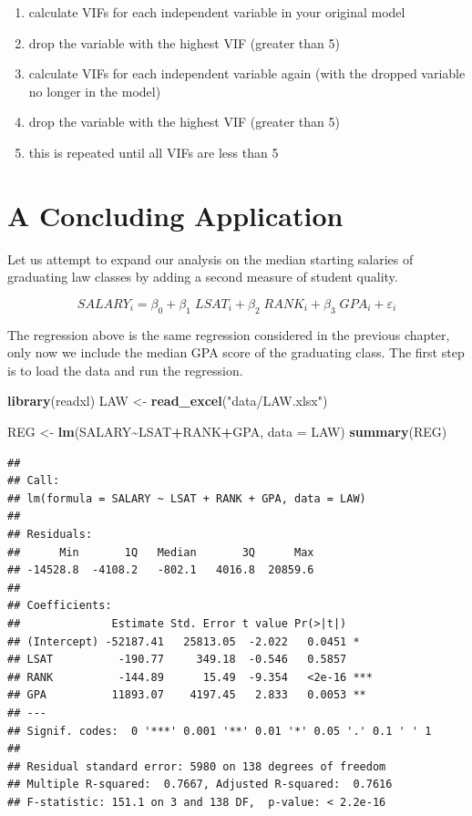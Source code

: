\documentclass[
]{book}
\newenvironment{Shaded}{\begin{snugshade}}{\end{snugshade}}
\newcommand{\AttributeTok}[1]{\textcolor[rgb]{0.13,0.29,0.53}{#1}}
\newcommand{\FunctionTok}[1]{\textcolor[rgb]{0.13,0.29,0.53}{\textbf{#1}}}
\newcommand{\NormalTok}[1]{#1}
\newcommand{\OtherTok}[1]{\textcolor[rgb]{0.56,0.35,0.01}{#1}}
\newcommand{\SpecialCharTok}[1]{\textcolor[rgb]{0.81,0.36,0.00}{\textbf{#1}}}
\newcommand{\StringTok}[1]{\textcolor[rgb]{0.31,0.60,0.02}{#1}}
\begin{document}
\begin{enumerate}
\def\labelenumi{\arabic{enumi}.}
\item
  calculate VIFs for each independent variable in your original model
\item
  drop the variable with the highest VIF (greater than 5)
\item
  calculate VIFs for each independent variable again (with the dropped variable no longer in the model)
\item
  drop the variable with the highest VIF (greater than 5)
\item
  this is repeated until all VIFs are less than 5
\end{enumerate}

\section{A Concluding Application}\label{a-concluding-application-2}

Let us attempt to expand our analysis on the median starting salaries of graduating law classes by adding a second measure of student quality.

\[SALARY_i = \beta_0 + \beta_1 \; LSAT_i + \beta_2 \; RANK_i + \beta_3 \; GPA_i + \varepsilon_i\]

The regression above is the same regression considered in the previous chapter, only now we include the median GPA score of the graduating class. The first step is to load the data and run the regression.

\begin{Shaded}
\begin{Highlighting}[]
\FunctionTok{library}\NormalTok{(readxl)}
\NormalTok{LAW }\OtherTok{\textless{}{-}} \FunctionTok{read\_excel}\NormalTok{(}\StringTok{"data/LAW.xlsx"}\NormalTok{)}

\NormalTok{REG }\OtherTok{\textless{}{-}} \FunctionTok{lm}\NormalTok{(SALARY}\SpecialCharTok{\textasciitilde{}}\NormalTok{LSAT}\SpecialCharTok{+}\NormalTok{RANK}\SpecialCharTok{+}\NormalTok{GPA, }\AttributeTok{data =}\NormalTok{ LAW)}
\FunctionTok{summary}\NormalTok{(REG)}
\end{Highlighting}
\end{Shaded}

\begin{verbatim}
## 
## Call:
## lm(formula = SALARY ~ LSAT + RANK + GPA, data = LAW)
## 
## Residuals:
##      Min       1Q   Median       3Q      Max 
## -14528.8  -4108.2   -802.1   4016.8  20859.6 
## 
## Coefficients:
##              Estimate Std. Error t value Pr(>|t|)    
## (Intercept) -52187.41   25813.05  -2.022   0.0451 *  
## LSAT          -190.77     349.18  -0.546   0.5857    
## RANK          -144.89      15.49  -9.354   <2e-16 ***
## GPA          11893.07    4197.45   2.833   0.0053 ** 
## ---
## Signif. codes:  0 '***' 0.001 '**' 0.01 '*' 0.05 '.' 0.1 ' ' 1
## 
## Residual standard error: 5980 on 138 degrees of freedom
## Multiple R-squared:  0.7667, Adjusted R-squared:  0.7616 
## F-statistic: 151.1 on 3 and 138 DF,  p-value: < 2.2e-16
\end{verbatim}
\end{document}

